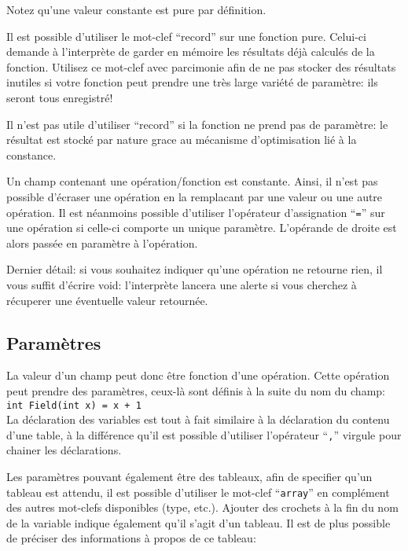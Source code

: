 \documentclass[a5paper, 12pt]{book}
\begin{document}
Notez qu'une valeur constante est pure par définition.

Il est possible d'utiliser le mot-clef ``record'' sur une fonction pure.
Celui-ci demande à l'interprète de garder en mémoire les résultats déjà
calculés de la fonction. Utilisez ce mot-clef avec parcimonie afin de
ne pas stocker des résultats inutiles si votre fonction peut prendre
une très large variété de paramètre: ils seront tous enregistré!

Il n'est pas utile d'utiliser ``record'' si la fonction ne prend pas de
paramètre: le résultat est stocké par nature grace au mécanisme
d'optimisation lié à la constance.

Un champ contenant une opération/fonction est constante. Ainsi, il n'est pas possible
d'écraser une opération en la remplacant par une valeur ou une autre
opération. Il est néanmoins possible d'utiliser l'opérateur d'assignation ``\verb!=!''
sur une opération si celle-ci comporte un unique paramètre. L'opérande
de droite est alors passée en paramètre à l'opération.

Dernier détail: si vous souhaitez indiquer qu'une opération ne retourne rien,
il vous suffit d'écrire void: l'interprète lancera une alerte si vous
cherchez à récuperer une éventuelle valeur retournée.

\subsection{Paramètres}

La valeur d'un champ peut donc être fonction d'une opération.
Cette opération peut prendre des paramètres, ceux-là sont définis à la suite
du nom du champ:\\

\verb!int Field(int x) = x + 1!\\

La déclaration des variables est tout à fait similaire à la déclaration
du contenu d'une table, à la différence qu'il est possible d'utiliser
l'opérateur ``\verb!,!'' virgule pour chainer les déclarations.

Les paramètres pouvant également être des tableaux, afin de specifier
qu'un tableau est attendu, il est possible d'utiliser le mot-clef
``\verb!array!'' en complément des autres mot-clefs disponibles (type,
etc.). Ajouter des crochets à la fin du nom de la variable indique
également qu'il s'agit d'un tableau.
Il est de plus possible de préciser des informations à propos de
ce tableau:
\end{document}
